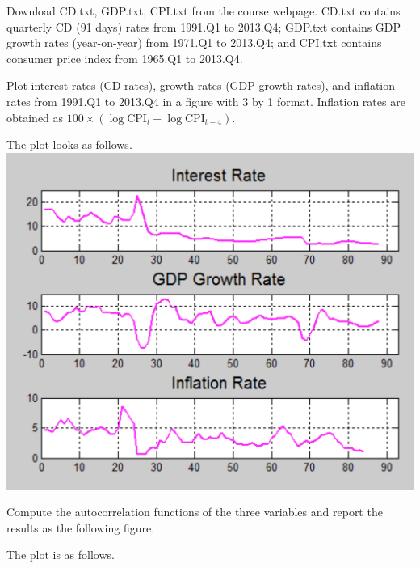 \documentclass[answers]{exam}
\begin{document}
\newpage
{}
Download CD.txt, GDP.txt, CPI.txt from the course webpage. CD.txt contains quarterly CD (91 days) rates from 1991.Q1 to 2013.Q4; GDP.txt contains GDP growth rates (year-on-year) from 1971.Q1 to 2013.Q4; and CPI.txt contains consumer price index from 1965.Q1 to 2013.Q4.
\begin{questions}
    \question
    Plot interest rates (CD rates), growth rates (GDP growth rates), and inflation rates from 1991.Q1 to 2013.Q4 in a figure with 3 by 1 format. Inflation rates are obtained as $100\times (\log \text{CPI}_{t}-\log \text{CPI}_{t-4})$.
    \begin{solution}
        The plot looks as follows.
        \centering
        \includegraphics[scale=0.5]{Problem1.png}
    \end{solution}
    \newpage
    \question Compute the autocorrelation functions of the three variables and report the results as the following figure.
    \begin{solution}
        The plot is as follows.
        \centering

\end{solution}
\end{questions}
\end{document}
